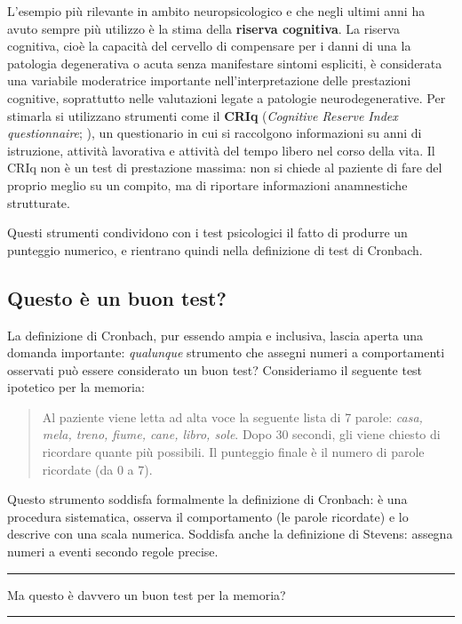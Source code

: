 \documentclass[
  italian,
  letterpaper,
  paper=6in:9in,
  pagesize=pdftex,
  headinclude=on,
  footinclude=on,
  11pt]{scrbook}
\newenvironment{domanda}{%
  \par\medskip\noindent\rule{\linewidth}{0.4pt}\vspace{3pt}%
  \begin{center}\large\itshape
}{%
  \end{center}\vspace{-4pt}\noindent\rule{\linewidth}{0.4pt}\par\medskip
}
\begin{document}
L'esempio più rilevante in ambito neuropsicologico e che negli ultimi
anni ha avuto sempre più utilizzo è la stima della \textbf{riserva
cognitiva}. La riserva cognitiva, cioè la capacità del cervello di
compensare per i danni di una la patologia degenerativa o acuta senza
manifestare sintomi espliciti, è considerata una variabile moderatrice
importante nell'interpretazione delle prestazioni cognitive, soprattutto
nelle valutazioni legate a patologie neurodegenerative. Per stimarla si
utilizzano strumenti come il \textbf{CRIq} (\emph{Cognitive Reserve
Index questionnaire}; \cite{nucci2012cognitive}), un questionario in cui
si raccolgono informazioni su anni di istruzione, attività lavorativa e
attività del tempo libero nel corso della vita. Il CRIq non è un test di
prestazione massima: non si chiede al paziente di fare del proprio
meglio su un compito, ma di riportare informazioni anamnestiche
strutturate.

Questi strumenti condividono con i test psicologici il fatto di produrre
un punteggio numerico, e rientrano quindi nella definizione di test di
Cronbach.

\subsection{Questo è un buon test?}\label{questo-uxe8-un-buon-test}

La definizione di Cronbach, pur essendo ampia e inclusiva, lascia aperta
una domanda importante: \emph{qualunque} strumento che assegni numeri a
comportamenti osservati può essere considerato un buon test?
Consideriamo il seguente test ipotetico per la memoria:

\begin{quote}
Al paziente viene letta ad alta voce la seguente lista di 7 parole:
\emph{casa, mela, treno, fiume, cane, libro, sole}. Dopo 30 secondi, gli
viene chiesto di ricordare quante più possibili. Il punteggio finale è
il numero di parole ricordate (da 0 a 7).
\end{quote}

Questo strumento soddisfa formalmente la definizione di Cronbach: è una
procedura sistematica, osserva il comportamento (le parole ricordate) e
lo descrive con una scala numerica. Soddisfa anche la definizione di
Stevens: assegna numeri a eventi secondo regole precise.

\begin{domanda}

Ma questo è davvero un buon test per la memoria?

\end{domanda}
\end{document}
